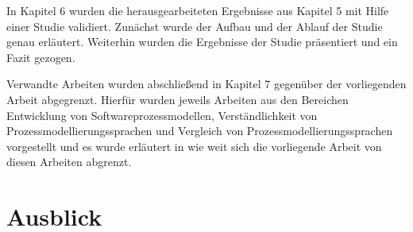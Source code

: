 In Kapitel 6 wurden die herausgearbeiteten Ergebnisse aus Kapitel 5 mit Hilfe einer Studie validiert. Zunächst wurde der Aufbau und der Ablauf der Studie genau erläutert. Weiterhin wurden die Ergebnisse der Studie präsentiert und ein Fazit gezogen. \newline

Verwandte Arbeiten wurden abschließend in Kapitel 7 gegenüber der vorliegenden Arbeit abgegrenzt. Hierfür wurden jeweils Arbeiten aus den Bereichen Entwicklung von Softwareprozessmodellen, Verständlichkeit von Prozessmodellierungssprachen und Vergleich von Prozessmodellierungssprachen vorgestellt und es wurde erläutert in wie weit sich die vorliegende Arbeit von diesen Arbeiten abgrenzt.





\section{Ausblick}
